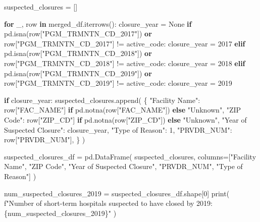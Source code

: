 \documentclass[
  letterpaper,
  DIV=11,
  numbers=noendperiod]{scrartcl}
\newenvironment{Shaded}{\begin{snugshade}}{\end{snugshade}}
\newcommand{\BuiltInTok}[1]{\textcolor[rgb]{0.00,0.23,0.31}{#1}}
\newcommand{\ControlFlowTok}[1]{\textcolor[rgb]{0.00,0.23,0.31}{\textbf{#1}}}
\newcommand{\DecValTok}[1]{\textcolor[rgb]{0.68,0.00,0.00}{#1}}
\newcommand{\KeywordTok}[1]{\textcolor[rgb]{0.00,0.23,0.31}{\textbf{#1}}}
\newcommand{\NormalTok}[1]{\textcolor[rgb]{0.00,0.23,0.31}{#1}}
\newcommand{\OperatorTok}[1]{\textcolor[rgb]{0.37,0.37,0.37}{#1}}
\newcommand{\SpecialCharTok}[1]{\textcolor[rgb]{0.37,0.37,0.37}{#1}}
\newcommand{\SpecialStringTok}[1]{\textcolor[rgb]{0.13,0.47,0.30}{#1}}
\newcommand{\StringTok}[1]{\textcolor[rgb]{0.13,0.47,0.30}{#1}}
\newcommand{\VariableTok}[1]{\textcolor[rgb]{0.07,0.07,0.07}{#1}}
\begin{document}
\begin{Shaded}
\begin{Highlighting}[]
\NormalTok{suspected\_closures }\OperatorTok{=}\NormalTok{ []}

\ControlFlowTok{for}\NormalTok{ \_, row }\KeywordTok{in}\NormalTok{ merged\_df.iterrows():}
\NormalTok{    closure\_year }\OperatorTok{=} \VariableTok{None}
    \ControlFlowTok{if}\NormalTok{ pd.isna(row[}\StringTok{"PGM\_TRMNTN\_CD\_2017"}\NormalTok{]) }\KeywordTok{or}\NormalTok{ row[}\StringTok{"PGM\_TRMNTN\_CD\_2017"}\NormalTok{] }\OperatorTok{!=}\NormalTok{ active\_code:}
\NormalTok{        closure\_year }\OperatorTok{=} \DecValTok{2017}
    \ControlFlowTok{elif}\NormalTok{ pd.isna(row[}\StringTok{"PGM\_TRMNTN\_CD\_2018"}\NormalTok{]) }\KeywordTok{or}\NormalTok{ row[}\StringTok{"PGM\_TRMNTN\_CD\_2018"}\NormalTok{] }\OperatorTok{!=}\NormalTok{ active\_code:}
\NormalTok{        closure\_year }\OperatorTok{=} \DecValTok{2018}
    \ControlFlowTok{elif}\NormalTok{ pd.isna(row[}\StringTok{"PGM\_TRMNTN\_CD\_2019"}\NormalTok{]) }\KeywordTok{or}\NormalTok{ row[}\StringTok{"PGM\_TRMNTN\_CD\_2019"}\NormalTok{] }\OperatorTok{!=}\NormalTok{ active\_code:}
\NormalTok{        closure\_year }\OperatorTok{=} \DecValTok{2019}

    \ControlFlowTok{if}\NormalTok{ closure\_year:}
\NormalTok{        suspected\_closures.append(}
\NormalTok{            \{}
                \StringTok{"Facility Name"}\NormalTok{: row[}\StringTok{"FAC\_NAME"}\NormalTok{] }\ControlFlowTok{if}\NormalTok{ pd.notna(row[}\StringTok{"FAC\_NAME"}\NormalTok{]) }\ControlFlowTok{else} \StringTok{"Unknown"}\NormalTok{,}
                \StringTok{"ZIP Code"}\NormalTok{: row[}\StringTok{"ZIP\_CD"}\NormalTok{] }\ControlFlowTok{if}\NormalTok{ pd.notna(row[}\StringTok{"ZIP\_CD"}\NormalTok{]) }\ControlFlowTok{else} \StringTok{"Unknown"}\NormalTok{,}
                \StringTok{"Year of Suspected Closure"}\NormalTok{: closure\_year,}
                \StringTok{"Type of Reason"}\NormalTok{: }\DecValTok{1}\NormalTok{,}
                \StringTok{"PRVDR\_NUM"}\NormalTok{: row[}\StringTok{"PRVDR\_NUM"}\NormalTok{],}
\NormalTok{            \}}
\NormalTok{        )}

\NormalTok{suspected\_closures\_df }\OperatorTok{=}\NormalTok{ pd.DataFrame(}
\NormalTok{    suspected\_closures, }
\NormalTok{    columns}\OperatorTok{=}\NormalTok{[}\StringTok{"Facility Name"}\NormalTok{, }\StringTok{"ZIP Code"}\NormalTok{, }\StringTok{"Year of Suspected Closure"}\NormalTok{, }\StringTok{"PRVDR\_NUM"}\NormalTok{, }\StringTok{"Type of Reason"}\NormalTok{]}
\NormalTok{)}

\NormalTok{num\_suspected\_closures\_2019 }\OperatorTok{=}\NormalTok{ suspected\_closures\_df.shape[}\DecValTok{0}\NormalTok{]}
\BuiltInTok{print}\NormalTok{(}
    \SpecialStringTok{f"Number of short{-}term hospitals suspected to have closed by 2019: }\SpecialCharTok{\{}\NormalTok{num\_suspected\_closures\_2019}\SpecialCharTok{\}}\SpecialStringTok{"}
\NormalTok{)}
\end{Highlighting}
\end{Shaded}
\end{document}
